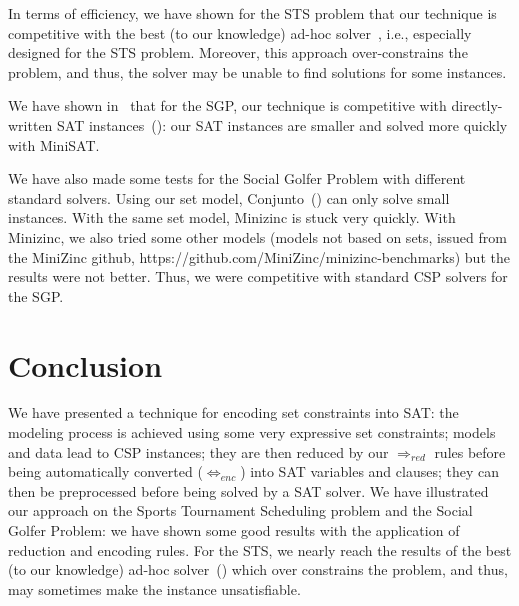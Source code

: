 \documentclass[3p,authoryear,times]{elsarticle}
\newcommand{\rmin}[0]{{\Rightarrow_{red}}}
\newcommand{\enc}[0]{\Leftrightarrow_{enc}}
\begin{document}
\medskip

In terms of efficiency, we have shown for the STS problem that our technique is competitive with the best (to our knowledge) ad-hoc solver~\cite{hamiez14}, i.e., especially designed for the STS problem. Moreover, this approach over-constrains the problem, and thus, the solver may be unable to find solutions for some instances.

We have shown in~\cite{aor} that for the SGP, our technique is competitive with directly-written SAT instances~(\cite{TriskaMusliu2012}): our SAT instances are smaller and solved more quickly with MiniSAT.

We have also made some tests for the Social Golfer Problem with different standard solvers. Using our set model, Conjunto~(\cite{ConjuntoILPS94}) can only solve small instances. With the same set model, Minizinc is stuck very quickly. With Minizinc, we also tried some other models (models not based on sets, issued from the MiniZinc github, https://github.com/MiniZinc/minizinc-benchmarks)  but the results were not better. Thus, we were competitive with standard CSP solvers for the SGP.





\section{Conclusion}
\label{sec:conclusion}

We have presented a technique for encoding set constraints into SAT:  the modeling process is achieved using some very expressive set constraints; models and data lead to CSP instances; they are then reduced by our $\rmin$ rules before being automatically converted ($\enc$) into SAT variables and clauses; they can then be preprocessed before being solved by a SAT solver.
We have illustrated our approach on the Sports Tournament Scheduling problem and the Social Golfer Problem: we have shown some good results with the application of reduction and encoding rules. For the STS, we nearly reach the results of the best (to our knowledge) ad-hoc solver~(\cite{hamiez14}) which over constrains the problem, and thus, may sometimes make the instance unsatisfiable.
\end{document}
